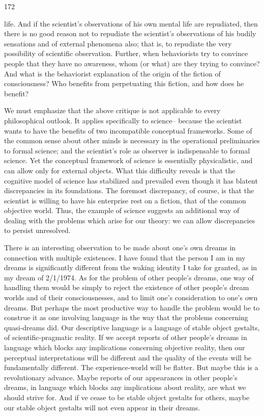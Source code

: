 \documentclass[10pt,twoside]{memoir}
\begin{document}
\begin{enumerate}
{\begin{enumerate}
\begin{sysrules}
\begin{sysrules}
\begin{sysrules}
\begin{sysrules}
{\begin{enumerate}
{{{{{{{172 


life. And if the scientist's observations of his own mental life are repudiated, 
then there is no good reason not to repudiate the scientist's observations of 
his budily sensations and of external phenomena also; that is, to repudiate 
the very possibility of scientific observation. Further, when behaviorists try 
to convince people that they have no awareness, whom (or what) are they 
trying to convince? And what is the behaviorist explanation of the origin of 
the fiction of consciousness? Who benefits from perpetuating this fiction, 
and how does he benefit? 

We must emphasize that the above critique is not applicable to every 
philosophical outlook. It applies specifically to science-- because the scientist 
wants to have the benefits of two incompatible conceptual frameworks. 
Some of the common sense about other minds is necessary in the operational 
preliminaries to formal science; and the scientist's role as observer is 
indispensable to formal science. Yet the conceptual framework of science is 
essentially physicalistic, and can allow only for external objects. What this 
difficulty reveals is that the cognitive model of science has stabilized and 
prevailed even though it has blatent discrepancies in its foundations. The 
foremost discrepancy, of course, is that the scientist is willing to have his 
enterprise rest on a fiction, that of the common objective world. Thus, the 
example of science suggests an additional way of dealing with the problems 
which arise for our theory: we can allow discrepancies to persist unresolved. 

There is an interesting observation to be made about one's own dreams 
in connection with multiple existences. I have found that the person I am in 
my dreams is significantly different from the waking identity I take for 
granted, as in my dream of 2/1/1974. As for the problem of other people's 
dreams, one way of handling them would be simply to reject the existence of 
other people's dream worlds and of their consciousnesses, and to limit one's 
consideration to one's own dreams. But perhaps the most productive way to 
handle the problem would be to construe it as one involving language in the 
way that the problems concerning quasi-dreams did. Our descriptive language 
is a language of stable object gestalts, of scientific-pragmatic reality. If we 
accept reports of other people's dreams in language which blocks any 
implications concerning objective reality, then our perceptual interpretations 
will be different and the quality of the events will be fundamentally 
different. The experience-world will be flatter. But maybe this is a 
revolutionary advance. Maybe reports of our appearances in other people's 
dreams, in language which blocks any implications about reality, are what we 
should strive for. And if ve cease to be stable object gestalts for others, 
maybe our stable object gestalts will not even appear in their dreams. 


}}}}}}}
\end{enumerate}}
\end{sysrules}
\end{sysrules}
\end{sysrules}
\end{sysrules}
\end{enumerate}}
\end{enumerate}
\end{document}

